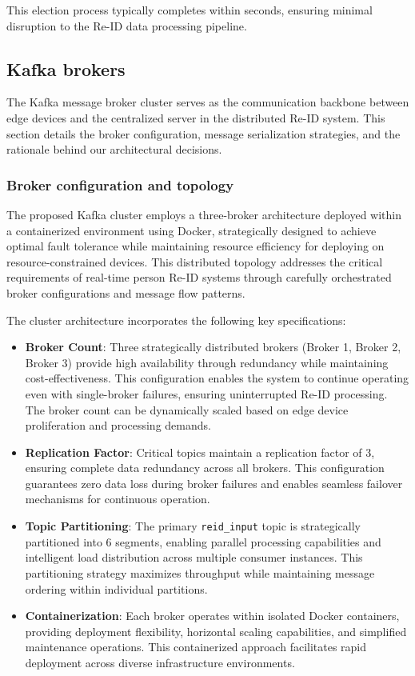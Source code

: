 This election process typically completes within seconds, ensuring minimal disruption to the Re-ID data processing pipeline.

\subsection{Kafka brokers}

The Kafka message broker cluster serves as the communication backbone between edge devices and the centralized server in the distributed Re-ID system. This section details the broker configuration, message serialization strategies, and the rationale behind our architectural decisions.

\subsubsection{Broker configuration and topology}

The proposed Kafka cluster employs a three-broker architecture deployed within a containerized environment using Docker, strategically designed to achieve optimal fault tolerance while maintaining resource efficiency for deploying on resource-constrained devices. This distributed topology addresses the critical requirements of real-time person Re-ID systems through carefully orchestrated broker configurations and message flow patterns.

The cluster architecture incorporates the following key specifications:

\begin{itemize}
   \item \textbf{Broker Count}: Three strategically distributed brokers (Broker 1, Broker 2, Broker 3) provide high availability through redundancy while maintaining cost-effectiveness. This configuration enables the system to continue operating even with single-broker failures, ensuring uninterrupted Re-ID processing. The broker count can be dynamically scaled based on edge device proliferation and processing demands.
   \item \textbf{Replication Factor}: Critical topics maintain a replication factor of 3, ensuring complete data redundancy across all brokers. This configuration guarantees zero data loss during broker failures and enables seamless failover mechanisms for continuous operation.
   \item \textbf{Topic Partitioning}: The primary \texttt{reid\_input} topic is strategically partitioned into 6 segments, enabling parallel processing capabilities and intelligent load distribution across multiple consumer instances. This partitioning strategy maximizes throughput while maintaining message ordering within individual partitions.
   \item \textbf{Containerization}: Each broker operates within isolated Docker containers, providing deployment flexibility, horizontal scaling capabilities, and simplified maintenance operations. This containerized approach facilitates rapid deployment across diverse infrastructure environments.
\end{itemize}

